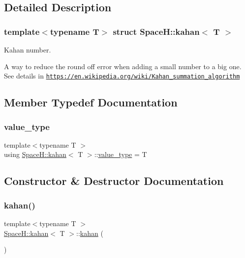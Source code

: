 \subsection{Detailed Description}
\subsubsection*{template$<$typename T$>$\newline
struct Space\+H\+::kahan$<$ T $>$}

Kahan number. 

A way to reduce the round off error when adding a small number to a big one. See details in \href{https://en.wikipedia.org/wiki/Kahan_summation_algorithm}{\tt https\+://en.\+wikipedia.\+org/wiki/\+Kahan\+\_\+summation\+\_\+algorithm} 

\subsection{Member Typedef Documentation}
\mbox{\label{struct_space_h_1_1kahan_ae2e0e0627b003662802b12bf6b02f551}} 
\subsubsection{\texorpdfstring{value\+\_\+type}{value\_type}}
{\footnotesize\ttfamily template$<$typename T $>$ \\
using \mbox{\hyperlink{struct_space_h_1_1kahan}{Space\+H\+::kahan}}$<$ T $>$\+::\mbox{\hyperlink{struct_space_h_1_1kahan_ae2e0e0627b003662802b12bf6b02f551}{value\+\_\+type}} =  T}



\subsection{Constructor \& Destructor Documentation}
\mbox{\label{struct_space_h_1_1kahan_a97b3bd761defb5ed56ec1693822a23aa}} 
\subsubsection{\texorpdfstring{kahan()}{kahan()}\hspace{0.1cm}{\footnotesize\ttfamily [1/3]}}
{\footnotesize\ttfamily template$<$typename T $>$ \\
\mbox{\hyperlink{struct_space_h_1_1kahan}{Space\+H\+::kahan}}$<$ T $>$\+::\mbox{\hyperlink{struct_space_h_1_1kahan}{kahan}} (\begin{DoxyParamCaption}{ }\end{DoxyParamCaption})\hspace{0.3cm}{\ttfamily [inline]}}

